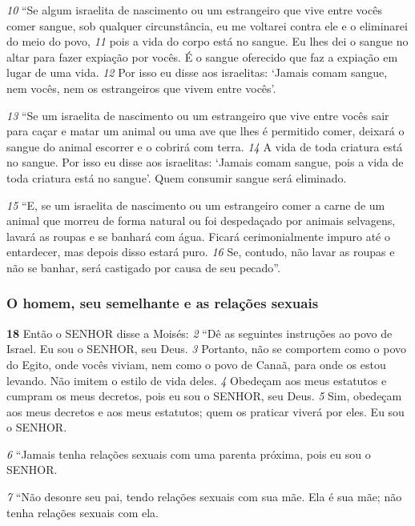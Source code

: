 \textit{\tiny 10}
“Se algum israelita de nascimento ou um estrangeiro que vive entre vocês
comer sangue, sob qualquer circunstância, eu me voltarei contra ele e o eliminarei
do meio do povo, 
\textit{\tiny 11}
pois a vida do corpo está no sangue. Eu lhes dei o sangue no
altar para fazer expiação por vocês. É o sangue oferecido que faz a expiação em
lugar de uma vida. 
\textit{\tiny 12}
Por isso eu disse aos israelitas: ‘Jamais comam sangue, nem
vocês, nem os estrangeiros que vivem entre vocês’.
   
\textit{\tiny 13}
“Se um israelita de nascimento ou um estrangeiro que vive entre vocês sair
para caçar e matar um animal ou uma ave que lhes é permitido comer, deixará o
sangue do animal escorrer e o cobrirá com terra. 
\textit{\tiny 14}
A vida de toda criatura está no
sangue. Por isso eu disse aos israelitas: ‘Jamais comam sangue, pois a vida de toda
criatura está no sangue’. Quem consumir sangue será eliminado.
   
\textit{\tiny 15}
“E, se um israelita de nascimento ou um estrangeiro comer a carne de um
animal que morreu de forma natural ou foi despedaçado por animais selvagens,
lavará as roupas e se banhará com água. Ficará cerimonialmente impuro até o
entardecer, mas depois disso estará puro. 
\textit{\tiny 16}
Se, contudo, não lavar as roupas e não
se banhar, será castigado por causa de seu pecado”.

\bigskip
\subsubsection*{O homem, seu semelhante e as relações sexuais}
   
\textbf{\large 18}
 Então o SENHOR disse a Moisés: 
\textit{\tiny 2} 
“Dê as seguintes instruções ao povo de
Israel. Eu sou o SENHOR, seu Deus. 
\textit{\tiny 3} 
Portanto, não se comportem como o povo do
Egito, onde vocês viviam, nem como o povo de Canaã, para onde os estou levando.
Não imitem o estilo de vida deles. 
\textit{\tiny 4} 
Obedeçam aos meus estatutos e cumpram os
meus decretos, pois eu sou o SENHOR, seu Deus. 
\textit{\tiny 5} 
Sim, obedeçam aos meus
decretos e aos meus estatutos; quem os praticar viverá por eles. Eu sou o SENHOR. 

\smallskip
\textit{\tiny 6} 
“Jamais tenha relações sexuais com uma parenta próxima, pois eu sou o
SENHOR. 

\smallskip
\textit{\tiny 7} 
“Não desonre seu pai, tendo relações sexuais com sua mãe. Ela é sua mãe; não
tenha relações sexuais com ela. 

